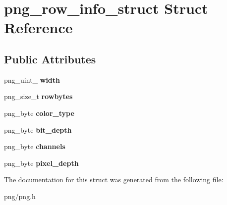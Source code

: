 \hypertarget{structpng__row__info__struct}{}\section{png\+\_\+row\+\_\+info\+\_\+struct Struct Reference}
\label{structpng__row__info__struct}
\subsection*{Public Attributes}
\begin{DoxyCompactItemize}
\item 
png\+\_\+uint\+\_ {\bfseries width}\hypertarget{structpng__row__info__struct_a1ab107da5ffee8100eeaa76cc5ba3e62}{}\label{structpng__row__info__struct_a1ab107da5ffee8100eeaa76cc5ba3e62}

\item 
png\+\_\+size\+\_\+t {\bfseries rowbytes}\hypertarget{structpng__row__info__struct_a924a208653f2577c05db5e1cf3aa5817}{}\label{structpng__row__info__struct_a924a208653f2577c05db5e1cf3aa5817}

\item 
png\+\_\+byte {\bfseries color\+\_\+type}\hypertarget{structpng__row__info__struct_a646244422549c66e6661cfcdb67c8e28}{}\label{structpng__row__info__struct_a646244422549c66e6661cfcdb67c8e28}

\item 
png\+\_\+byte {\bfseries bit\+\_\+depth}\hypertarget{structpng__row__info__struct_a6b14d5d0cc32f151c28c568cf1c1f82d}{}\label{structpng__row__info__struct_a6b14d5d0cc32f151c28c568cf1c1f82d}

\item 
png\+\_\+byte {\bfseries channels}\hypertarget{structpng__row__info__struct_a7cefee70361a3789a862001aefcd872f}{}\label{structpng__row__info__struct_a7cefee70361a3789a862001aefcd872f}

\item 
png\+\_\+byte {\bfseries pixel\+\_\+depth}\hypertarget{structpng__row__info__struct_a70b84917ef9eabc9b7d29ec96fd01153}{}\label{structpng__row__info__struct_a70b84917ef9eabc9b7d29ec96fd01153}

\end{DoxyCompactItemize}


The documentation for this struct was generated from the following file\+:\begin{DoxyCompactItemize}
\item 
png/png.\+h\end{DoxyCompactItemize}
